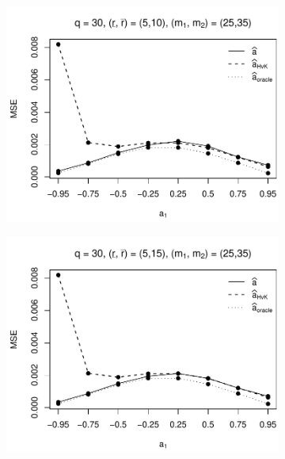 \begin{figure}[p]
\begin{subfigure}[b]{0.45\textwidth}
\includegraphics[width=\textwidth]{Plots/Plots_Supplement/MSE_a_T=500_slope=1_(L1,L2,K1,K2,M1,M2)=(30,30,5,10,25,35).pdf}
\end{subfigure}
\hspace{0.25cm}
\begin{subfigure}[b]{0.45\textwidth}
\includegraphics[width=\textwidth]{Plots/Plots_Supplement/MSE_a_T=500_slope=1_(L1,L2,K1,K2,M1,M2)=(30,30,5,15,25,35).pdf}
\end{subfigure}


\end{figure}
